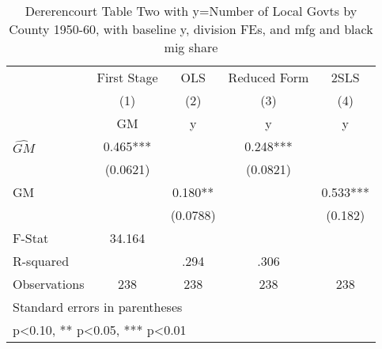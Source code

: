 \begin{table}[htbp]\centering
\def\sym#1{\ifmmode^{#1}\else\(^{#1}\)\fi}
\caption{Dererencourt Table Two with y=Number of Local Govts by County 1950-60, with baseline y, division FEs, and mfg and black mig share}
\begin{tabular}{l*{4}{c}}
\toprule
                    & First Stage   &         OLS   &Reduced Form   &        2SLS   \\
                    &\multicolumn{1}{c}{(1)}&\multicolumn{1}{c}{(2)}&\multicolumn{1}{c}{(3)}&\multicolumn{1}{c}{(4)}\\
                    &\multicolumn{1}{c}{GM}&\multicolumn{1}{c}{y}&\multicolumn{1}{c}{y}&\multicolumn{1}{c}{y}\\
\midrule
$\hat{GM}$          &       0.465***&               &       0.248***&               \\
                    &    (0.0621)   &               &    (0.0821)   &               \\
\addlinespace
GM                  &               &       0.180** &               &       0.533***\\
                    &               &    (0.0788)   &               &     (0.182)   \\
\midrule
F-Stat              &      34.164   &               &               &               \\
R-squared           &               &        .294   &        .306   &               \\
Observations        &         238   &         238   &         238   &         238   \\
\bottomrule
\multicolumn{5}{l}{\footnotesize Standard errors in parentheses}\\
\multicolumn{5}{l}{\footnotesize * p<0.10, ** p<0.05, *** p<0.01}\\
\end{tabular}
\end{table}
